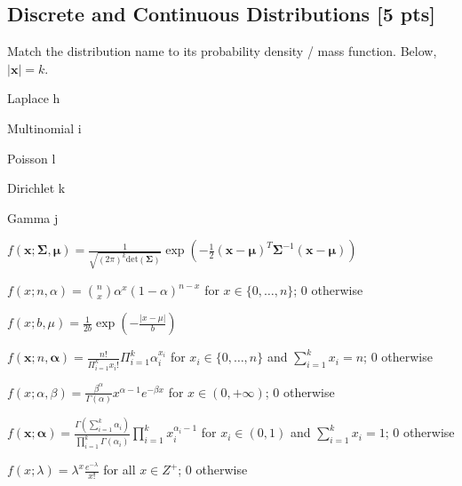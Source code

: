 \documentclass[a4paper]{article}
\theoremstyle{definition}
\newcommand{\vc}[1]{\boldsymbol{#1}}
\newcommand{\xv}{\vc{x}}
\newcommand{\Sigmav}{\vc{\Sigma}}
\newcommand{\alphav}{\vc{\alpha}}
\newcommand{\muv}{\vc{\mu}}
\newenvironment{soln}{
    \leavevmode\color{blue}\ignorespaces
}{}
\begin{document}
\subsection{Discrete and Continuous Distributions [5 pts]}
Match the distribution name to its probability density / mass
function. Below, $|\xv| = k$.
\begin{enumerate}[(a)]
\begin{minipage}{0.3\linewidth}
    \item Laplace \begin{soln}  h \end{soln}
    \item Multinomial \begin{soln}  i \end{soln}
    \item Poisson \begin{soln}  l \end{soln}
    \item Dirichlet \begin{soln}  k \end{soln}
    \item Gamma \begin{soln}  j \end{soln}
\end{minipage}
\begin{minipage}{0.5\linewidth}
    \item $f(\xv; \Sigmav, \muv) = \frac{1}{\sqrt{(2\pi)^k \mathrm{det}(\Sigmav) }} \exp\left( -\frac{1}{2}
        (\xv - \muv)^T \Sigmav^{-1} (\xv - \muv)  \right)$
    \item $f(x; n, \alpha) = \binom{n}{x} \alpha^x (1 - \alpha)^{n-x}$
      for $x \in \{0,\ldots, n\}$; $0$ otherwise
    \item $f(x; b, \mu) = \frac{1}{2b} \exp\left( - \frac{|x - \mu|}{b} \right)$
    \item $f(\xv; n, \alphav) = \frac{n!}{\Pi_{i=1}^k x_i!}
      \Pi_{i=1}^k \alpha_i^{x_i}$ for $x_i \in \{0,\ldots,n\}$ and
      $\sum_{i=1}^k x_i = n$; $0$ otherwise
    \item $f(x; \alpha, \beta) = \frac{\beta^{\alpha}}{\Gamma(\alpha)} x^{\alpha -
        1}e^{-\beta x}$ for $x \in (0,+\infty)$; $0$ otherwise
    \item $f(\xv; \alphav) = \frac{\Gamma(\sum_{i=1}^k
        \alpha_i)}{\prod_{i=1}^k \Gamma(\alpha_i)} \prod_{i=1}^{k}
      x_i^{\alpha_i - 1}$ for $x_i \in (0,1)$ and $\sum_{i=1}^k x_i =
      1$; 0 otherwise
    \item $f(x; \lambda) = \lambda^x \frac{e^{-\lambda}}{x!}$ for all
      $x \in Z^+$; $0$ otherwise
\end{minipage}
\end{enumerate}
        
\end{document}
